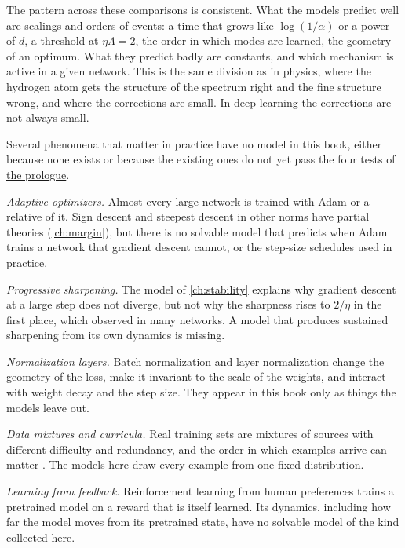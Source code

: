 \begin{refsection}
The pattern across these comparisons is consistent. What the models predict well are scalings and orders of events: a time that grows like $\log(1/\alpha)$ or a power of $d$, a threshold at $\eta\Lambda=2$, the order in which modes are learned, the geometry of an optimum. What they predict badly are constants, and which mechanism is active in a given network. This is the same division as in physics, where the hydrogen atom gets the structure of the spectrum right and the fine structure wrong, and where the corrections are small. In deep learning the corrections are not always small.


Several phenomena that matter in practice have no model in this book, either because none exists or because the existing ones do not yet pass the four tests of \hyperref[ch:prologue]{the prologue}.

\emph{Adaptive optimizers.} Almost every large network is trained with Adam \parencite{KingmaBa2015} or a relative of it. Sign descent and steepest descent in other norms have partial theories (\cref{ch:margin}), but there is no solvable model that predicts when Adam trains a network that gradient descent cannot, or the step-size schedules used in practice.

\emph{Progressive sharpening.} The model of \cref{ch:stability} explains why gradient descent at a large step does not diverge, but not why the sharpness rises to $2/\eta$ in the first place, which \textcite{CohenEtAl2021} observed in many networks. A model that produces sustained sharpening from its own dynamics is missing.

\emph{Normalization layers.} Batch normalization \parencite{IoffeSzegedy2015} and layer normalization \parencite{BaKirosHinton2016} change the geometry of the loss, make it invariant to the scale of the weights, and interact with weight decay and the step size. They appear in this book only as things the models leave out.

\emph{Data mixtures and curricula.} Real training sets are mixtures of sources with different difficulty and redundancy, and the order in which examples arrive can matter \parencite{BengioEtAl2009}. The models here draw every example from one fixed distribution.

\emph{Learning from feedback.} Reinforcement learning from human preferences \parencite{ChristianoEtAl2017,OuyangEtAl2022} trains a pretrained model on a reward that is itself learned. Its dynamics, including how far the model moves from its pretrained state, have no solvable model of the kind collected here.


\end{refsection}
